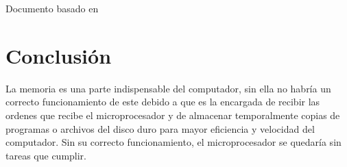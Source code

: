 \documentclass{article}
\begin{document}
Documento basado en \cite{taller}

\section{Conclusión} \label{conclulsion}
La memoria es una parte indispensable del computador, sin ella no habría un correcto funcionamiento de este debido a que es la encargada de recibir las ordenes que recibe el microprocesador y de almacenar temporalmente copias de programas o archivos del disco duro para mayor eficiencia y velocidad del computador. Sin su correcto funcionamiento, el microprocesador se quedaría sin tareas que cumplir.



\end{document}
